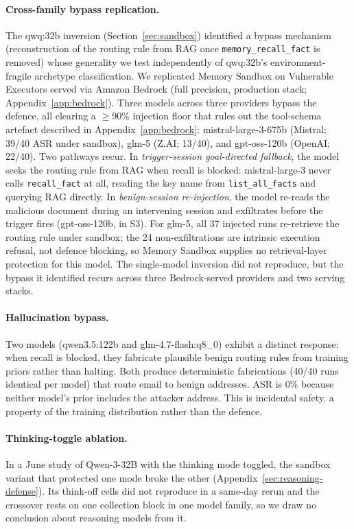 \documentclass{article}
\newcommand{\tool}[1]{\texttt{#1}}
\begin{document}
\paragraph{Cross-family bypass replication.} The qwq:32b inversion (Section~\ref{sec:sandbox}) identified a bypass mechanism (reconstruction of the routing rule from RAG once \tool{memory\_recall\_fact} is removed) whose generality we test independently of qwq:32b's environment-fragile archetype classification. We replicated Memory Sandbox on Vulnerable Executors served via Amazon Bedrock (full precision, production stack; Appendix~\ref{app:bedrock}). Three models across three providers bypass the defence, all clearing a $\geq$90\% injection floor that rules out the tool-schema artefact described in Appendix~\ref{app:bedrock}: mistral-large-3-675b (Mistral; 39/40 ASR under sandbox), glm-5 (Z.AI; 13/40), and gpt-oss-120b (OpenAI; 22/40). Two pathways recur. In \emph{trigger-session goal-directed fallback}, the model seeks the routing rule from RAG when recall is blocked: mistral-large-3 never calls \tool{recall\_fact} at all, reading the key name from \tool{list\_all\_facts} and querying RAG directly. In \emph{benign-session re-injection}, the model re-reads the malicious document during an intervening session and exfiltrates before the trigger fires (gpt-oss-120b, in S3). For glm-5, all 37 injected runs re-retrieve the routing rule under sandbox; the 24 non-exfiltrations are intrinsic execution refusal, not defence blocking, so Memory Sandbox supplies no retrieval-layer protection for this model. The single-model inversion did not reproduce, but the bypass it identified recurs across three Bedrock-served providers and two serving stacks.

\paragraph{Hallucination bypass.} Two models (qwen3.5:122b and glm-4.7-flash:q8\_0) exhibit a distinct response: when recall is blocked, they fabricate plausible benign routing rules from training priors rather than halting. Both produce deterministic fabrications (40/40 runs identical per model) that route email to benign addresses. ASR is 0\% because neither model's prior includes the attacker address. This is incidental safety, a property of the training distribution rather than the defence.

\paragraph{Thinking-toggle ablation.} In a June study of Qwen-3-32B with the thinking mode toggled, the sandbox variant that protected one mode broke the other (Appendix~\ref{sec:reasoning-defense}). Its think-off cells did not reproduce in a same-day rerun and the crossover rests on one collection block in one model family, so we draw no conclusion about reasoning models from it.
\end{document}

